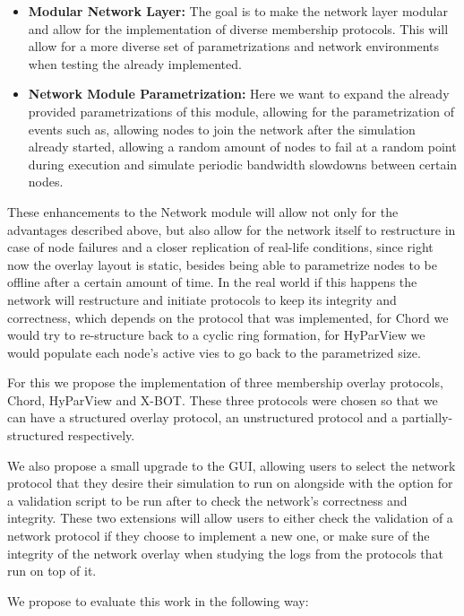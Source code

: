 \begin{itemize}
  \item \textbf{Modular Network Layer:} The goal is to make the network layer
modular and allow for the implementation of diverse membership protocols. This
will allow for a more diverse set of parametrizations and network environments
when testing the already implemented.
  \item \textbf{Network Module Parametrization:} Here we want to expand the already
provided parametrizations of this module, allowing for the parametrization of events
such as, allowing nodes to join the network after the simulation already started,
allowing a random amount of nodes to fail at a random point during execution and
simulate periodic bandwidth slowdowns between certain nodes.
\end{itemize}

These enhancements to the Network module will allow not only for the advantages
described above, but also allow for the network itself to restructure in case of
node failures and a closer replication of real-life conditions, since right now the
overlay layout is static, besides being able to parametrize nodes to be offline after
a certain amount of time. In the real world if this happens the network will restructure
and initiate protocols to keep its integrity and correctness, which depends on the
protocol that was implemented, for Chord we would try to re-structure back to a cyclic
ring formation, for HyParView we would populate each node's active vies to go back to the
parametrized size.

For this we propose the implementation of three membership overlay protocols, Chord,
HyParView and X-BOT. These three protocols were chosen so that we can have a
structured overlay protocol, an unstructured protocol and a partially-structured
respectively.

We also propose a small upgrade to the GUI, allowing users to select the network
protocol that they desire their simulation to run on alongside with the option for
a validation script to be run after to check the network's correctness and integrity.
These two extensions will allow users to either check the validation of a network
protocol if they choose to implement a new one, or make sure of the integrity of
the network overlay when studying the logs from the protocols that run on top of it.

We propose to evaluate this work in the following way:

